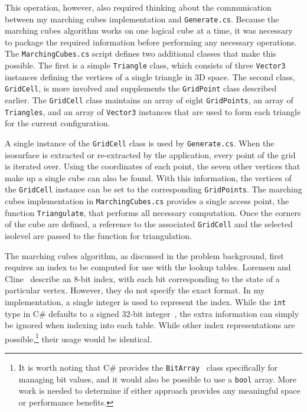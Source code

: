 \documentclass[pageno]{jpaper}
\begin{document}
This operation, however, also required thinking about the communication between my marching cubes implementation and \texttt{Generate.cs}. Because the marching cubes algorithm works on one logical cube at a time, it was necessary to package the required information before performing any necessary operations. The \texttt{MarchingCubes.cs} script defines two additional classes that make this possible. The first is a simple \texttt{Triangle} class, which consists of three \texttt{Vector3} instances defining the vertices of a single triangle in 3D space. The second class, \texttt{GridCell}, is more involved and supplements the \texttt{GridPoint} class described earlier. The \texttt{GridCell} class maintains an array of eight \texttt{GridPoints}, an array of \texttt{Triangles}, and an array of \texttt{Vector3} instances that are used to form each triangle for the current configuration.

A single instance of the \texttt{GridCell} class is used by \texttt{Generate.cs}. When the isosurface is extracted or re-extracted by the application, every point of the grid is iterated over. Using the coordinates of each point, the seven other vertices that make up a single cube can also be found. With this information, the vertices of the \texttt{GridCell} instance can be set to the corresponding \texttt{GridPoints}. The marching cubes implementation in \texttt{MarchingCubes.cs} provides a single access point, the function \texttt{Triangulate}, that performs all necessary computation. Once the corners of the cube are defined, a reference to the associated \texttt{GridCell} and the selected isolevel are passed to the function for triangulation.

The marching cubes algorithm, as discussed in the problem background, first requires an index to be computed for use with the lookup tables. Lorensen and Cline~\cite{lorensen} describe an 8-bit index, with each bit corresponding to the state of a particular vertex. However, they do not specify the exact format. In my implementation, a single integer is used to represent the index. While the \texttt{int} type in C\# defaults to a signed 32-bit integer~\cite{integer}, the extra information can simply be ignored when indexing into each table. While other index representations are possible,\footnote{It is worth noting that C\# provides the \texttt{BitArray}~\cite{bitarray} class specifically for managing bit values, and it would also be possible to use a \texttt{bool} array. More work is needed to determine if either approach provides any meaningful space or performance benefits.} their usage would be identical.
\end{document}
